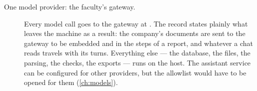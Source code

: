 \begin{description}
  \item[One model provider: the faculty's gateway.] Every model call goes to the gateway at
    . The record states plainly what leaves the machine as a result: the
    company's documents are sent to the gateway to be embedded and in the steps of a report,
    and whatever a chat reads travels with its turns. Everything else --- the database, the
    files, the parsing, the checks, the exports --- runs on the host. The assistant service
    can be configured for other providers, but the allowlist would have to be opened for
    them (\cref{ch:models}).
\end{description}
